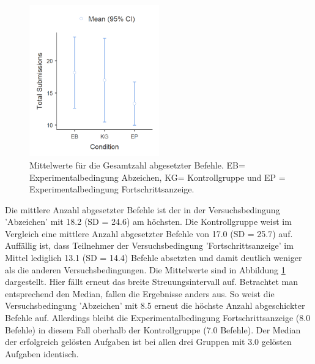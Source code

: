 \begin{figure}[htbp]
    \centering
    \includegraphics[width=0.5\textwidth]{img/auswertung/mean_total_subs.png}
    \caption{Mittelwerte für die Gesamtzahl abgesetzter Befehle. EB= Experimentalbedingung Abzeichen, KG= Kontrollgruppe und EP = Experimentalbedingung Fortschrittsanzeige.}
    \label{mean_subs}
\end{figure}
Die mittlere Anzahl abgesetzter Befehle ist der in der Versuchsbedingung 'Abzeichen' mit 18.2 (SD = 24.6) am höchsten. Die Kontrollgruppe weist im Vergleich eine mittlere Anzahl abgesetzter Befehle von 17.0 (SD = 25.7) auf. Auffällig ist, dass Teilnehmer der Versuchsbedingung 'Fortschrittsanzeige' im Mittel lediglich 13.1 (SD = 14.4) Befehle absetzten und damit deutlich weniger als die anderen Versuchsbedingungen. Die Mittelwerte sind in Abbildung \ref{mean_subs} dargestellt. Hier fällt erneut das breite Streuungsintervall auf. Betrachtet man entsprechend den Median, fallen die Ergebnisse anders aus. So weist die Versuchsbedingung 'Abzeichen' mit 8.5 erneut die höchste Anzahl abgeschickter Befehle auf. Allerdings bleibt die Experimentalbedingung Fortschrittsanzeige (8.0 Befehle) in diesem Fall oberhalb der Kontrollgruppe (7.0 Befehle). Der Median der erfolgreich gelösten Aufgaben ist bei allen drei Gruppen mit 3.0 gelösten Aufgaben identisch. 

